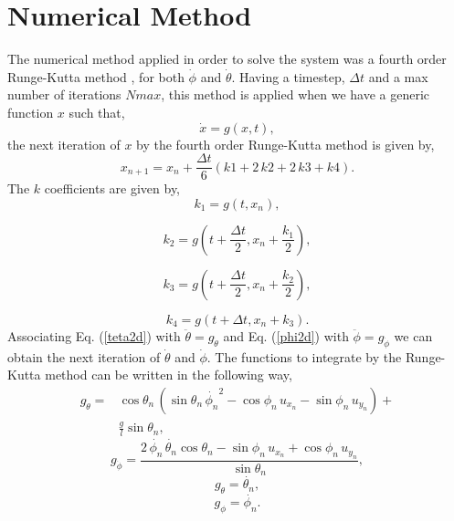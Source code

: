 \documentclass[prd,twocolumn,nofootinbib,showpacs]{revtex4-1}
\begin{document}
\section{Numerical Method}
The numerical method applied in order to solve the system was a fourth order Runge-Kutta method \cite{Rungekutta}, for both $\dot{\phi}$ and $\dot{\theta}$. Having a timestep, $\Delta t$ and a max number of iterations $Nmax$, this method is applied when we have a generic function $x$ such that,
\begin{equation}
\dot{x}=g(x,t),
\end{equation}
the next iteration of $x$ by the fourth order Runge-Kutta method is given by,
\begin{equation}
x_{n+1}=x_n+\frac{\Delta t}{6}(k1+2 \,k2+2\,k3+k4).
\end{equation}
The $k$ coefficients are given by,
\begin{equation}
k_1=   g(t,x_n ),
\end{equation}


\begin{equation}
    k_2= g\left(t+\frac{\Delta t}{2},x_n+\frac{k_1}{2}\right),
\end{equation}

\begin{equation}
        k_3= g\left(t+\frac{\Delta t}{2},x_n+\frac{k_2}{2}\right),
\end{equation}

\begin{equation}
      k_4= g(t+\Delta t,x_n+k_3).
\end{equation}
Associating Eq. (\ref{teta2d}) with $\ddot{\theta}=g_{\dot{\theta}}$ and Eq. (\ref{phi2d}) with $\ddot{\phi}=g_{\dot{\phi}}$ we can obtain the next iteration of  $\dot{\theta}$ and $\dot{\phi}$.  The functions to integrate by the Runge-Kutta method can be written in the following way,
\begin{align}
g_{\dot{\theta}}=&\cos{\theta_n}\,(\sin\theta_n \,\dot{\phi_n}^2- \cos{\phi_n}\, u_{x_n}- \sin{\phi_n}\, u_{y_n}) +\nonumber \\
&\frac{g}{l}\sin{\theta_n},
\end{align}
\begin{equation}
g_{\dot{\phi}} =\frac{2 \, \dot{\phi_n} \,\dot{\theta_n} \cos{\theta_n} -\sin{\phi_n}\, u_{x_n}+ \cos{\phi_n} \,u_{y_n}}{\sin{\theta_n}}, 
\end{equation}
\begin{equation}
g_{\theta}=\dot{\theta_n},
\end{equation}
\begin{equation}
    g_{\phi}=\dot{\phi_n}.
\end{equation}
\end{document}
